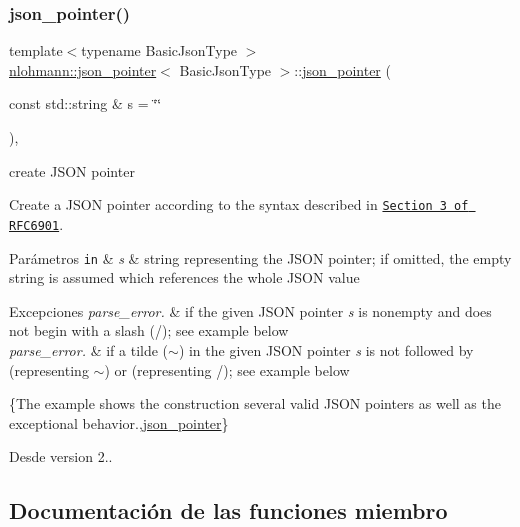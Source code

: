 \subsubsection{\texorpdfstring{json\+\_\+pointer()}{json\_pointer()}}
{\footnotesize\ttfamily template$<$typename Basic\+Json\+Type $>$ \\
\mbox{\hyperlink{classnlohmann_1_1json__pointer}{nlohmann\+::json\+\_\+pointer}}$<$ Basic\+Json\+Type $>$\+::\mbox{\hyperlink{classnlohmann_1_1json__pointer}{json\+\_\+pointer}} (\begin{DoxyParamCaption}\item[{const std\+::string \&}]{s = {\ttfamily \char`\"{}\char`\"{}} }\end{DoxyParamCaption})\hspace{0.3cm}{\ttfamily [inline]}, {\ttfamily [explicit]}}



create J\+S\+ON pointer 

Create a J\+S\+ON pointer according to the syntax described in \href{https://tools.ietf.org/html/rfc6901#section-3}{\tt Section 3 of R\+F\+C6901}.


\begin{DoxyParams}[1]{Parámetros}
\mbox{\tt in}  & {\em s} & string representing the J\+S\+ON pointer; if omitted, the empty string is assumed which references the whole J\+S\+ON value\\
\hline
\end{DoxyParams}

\begin{DoxyExceptions}{Excepciones}
{\em parse\+\_\+error.} & if the given J\+S\+ON pointer {\itshape s} is nonempty and does not begin with a slash ({\ttfamily /}); see example below\\
\hline
{\em parse\+\_\+error.} & if a tilde ({\ttfamily $\sim$}) in the given J\+S\+ON pointer {\itshape s} is not followed by {} (representing {\ttfamily $\sim$}) or {} (representing {\ttfamily /}); see example below\\
\hline
\end{DoxyExceptions}
\{The example shows the construction several valid J\+S\+ON pointers as well as the exceptional behavior.,\mbox{\hyperlink{classnlohmann_1_1json__pointer}{json\+\_\+pointer}}\}

\begin{DoxySince}{Desde}
version 2.. 
\end{DoxySince}


\subsection{Documentación de las funciones miembro}
\mbox{\label{classnlohmann_1_1json__pointer_a213bc67c32a30c68ac6bf06f5195d482}} 

